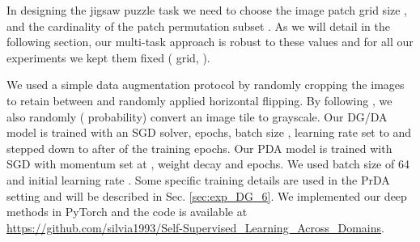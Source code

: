 In designing the jigsaw puzzle task we need to choose the image patch grid size , and the cardinality of the patch permutation subset . 
As we will detail in the following section, our multi-task approach is robust to these values and for all our experiments we kept them fixed ( grid, ).

We used a simple data augmentation protocol by randomly cropping the images to retain between  and randomly applied horizontal flipping. By following \cite{Noroozi_2018_CVPR}, we also randomly ( probability) convert an image tile to grayscale.
Our DG/DA model is trained with an SGD solver,  epochs, batch size ,  learning rate set to  and stepped down to  after  of the training epochs.
Our PDA model is trained with 
SGD with momentum set at , weight decay   and  epochs. We used batch size of 64 and initial learning rate .
Some specific training details are used in the PrDA setting and will be  described in Sec. \ref{sec:exp_DG_6}.
We implemented our deep methods in PyTorch and the code is available at \url{https://github.com/silvia1993/Self-Supervised_Learning_Across_Domains}.


